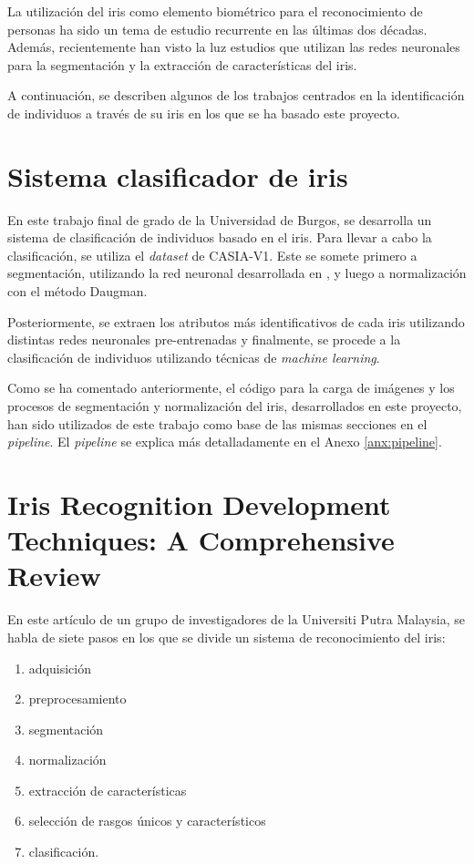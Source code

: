  \label{capitulo6}

La utilización del iris como elemento biométrico para el reconocimiento de personas ha sido un tema de estudio recurrente en las últimas dos décadas.
Además, recientemente han visto la luz estudios que utilizan las redes neuronales para la segmentación y la extracción de características del iris.

A continuación, se describen algunos de los trabajos centrados en la identificación de individuos a través de su iris en los que se ha basado este proyecto.

\section{Sistema clasificador de iris}

En este trabajo final de grado \cite{tfg_iris_2020} de la Universidad de Burgos, se desarrolla un sistema de clasificación  de individuos basado en el iris. Para llevar a cabo la clasificación, se utiliza el \textit{dataset} 
de CASIA-V1. Este se somete primero a segmentación, utilizando la red neuronal desarrollada en \cite{lozej_end--end_2018}, y luego a normalización con el método Daugman. 

Posteriormente, se extraen los atributos más identificativos de cada iris utilizando distintas redes neuronales pre-entrenadas y finalmente, se procede a la clasificación de individuos utilizando técnicas de \textit{machine learning}.

Como se ha comentado anteriormente, el código para la carga de imágenes y los procesos de segmentación y normalización del iris, desarrollados en este proyecto, han sido utilizados de este trabajo como 
base de las mismas secciones en el \textit{pipeline}. El \textit{pipeline} se explica más detalladamente en el Anexo \ref{anx:pipeline}.

\section{Iris Recognition Development Techniques: A Comprehensive Review}

En este artículo \cite{malgheet_iris_2021} de un grupo de investigadores de la Universiti Putra Malaysia, se habla de siete pasos en los que se divide un sistema de reconocimiento del iris:
\begin{enumerate}
\item adquisición
\item preprocesamiento
\item segmentación
\item normalización
\item extracción de características
\item selección de rasgos únicos y característicos
\item clasificación. 
\end{enumerate}
 
